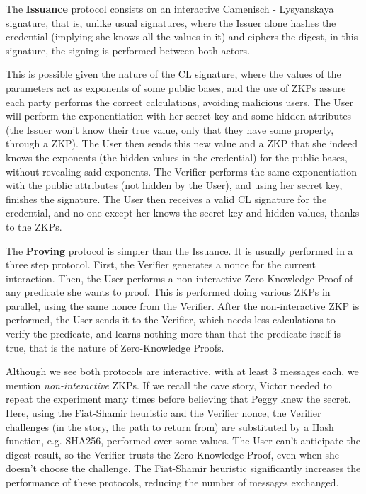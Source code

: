 \hfil

The \textbf{Issuance} protocol consists on an interactive Camenisch - Lysyanskaya signature, that is, unlike usual signatures, where the Issuer alone hashes the credential (implying she knows all the values in it) and ciphers the digest, in this signature, the signing is performed between both actors.

This is possible given the nature of the CL signature, where the values of the parameters act as exponents of some public bases, and the use of ZKPs assure each party performs the correct calculations, avoiding malicious users. The User will perform the exponentiation with her secret key and some hidden attributes (the Issuer won't know their true value, only that they have some property, through a ZKP). The User then sends this new value and a ZKP that she indeed knows the exponents (the hidden values in the credential) for the public bases, without revealing said exponents. The Verifier performs the same exponentiation with the public attributes (not hidden by the User), and using her secret key, finishes the signature. The User then receives a valid CL signature for the credential, and no one except her knows the secret key and hidden values, thanks to the ZKPs.

The \textbf{Proving} protocol is simpler than the Issuance. It is usually performed in a three step protocol. First, the Verifier generates a nonce for the current interaction. Then, the User performs a non-interactive Zero-Knowledge Proof of any predicate she wants to proof. This is performed doing various ZKPs in parallel, using the same nonce from the Verifier. After the non-interactive ZKP is performed, the User sends it to the Verifier, which needs less calculations to verify the predicate, and learns nothing more than that the predicate itself is true, that is the nature of Zero-Knowledge Proofs.

Although we see both protocols are interactive, with at least 3 messages each, we mention \textit{non-interactive} ZKPs. If we recall the cave story, Victor needed to repeat the experiment many times before believing that Peggy knew the secret. Here, using the Fiat-Shamir heuristic and the Verifier nonce, the Verifier challenges (in the story, the path to return from) are substituted by a Hash function, e.g. SHA256, performed over some values. The User can't anticipate the digest result, so the Verifier trusts the Zero-Knowledge Proof, even when she doesn't choose the challenge. The Fiat-Shamir heuristic significantly increases the performance of these protocols, reducing the number of messages exchanged.



